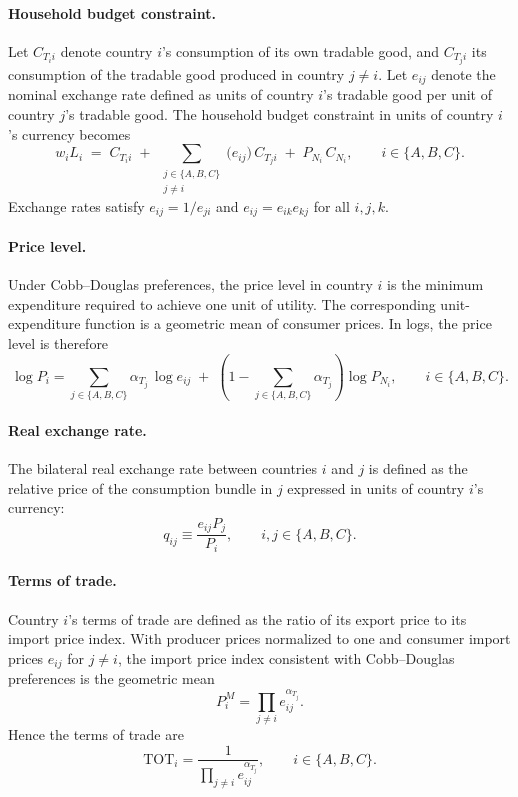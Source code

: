 \documentclass[11pt]{article}
\begin{document}
\paragraph{Household budget constraint.}
Let $C_{T_i i}$ denote country $i$’s consumption of its own tradable good, 
and $C_{T_j i}$ its consumption of the tradable good produced in country $j \neq i$. 
Let $e_{ij}$ denote the nominal exchange rate defined as units of country $i$’s tradable good per unit of country $j$’s tradable good. 
The household budget constraint in units of country $i$’s currency becomes
\begin{equation}
w_i L_i
\;=\;
C_{T_i i}
\;+\;
\sum_{\substack{j \in \{A,B,C\}\\ j \neq i}}
\big( e_{ij} \big)\, C_{T_j i}
\;+\;
P_{N_i}\, C_{N_i},
\qquad i \in \{A,B,C\}.
\end{equation}
Exchange rates satisfy $e_{ij}=1/e_{ji}$ and $e_{ij}=e_{ik}e_{kj}$ for all $i,j,k$.

\paragraph{Price level.}
Under Cobb--Douglas preferences, the price level in country $i$ is the minimum
expenditure required to achieve one unit of utility. The corresponding
unit-expenditure function is a geometric mean of consumer prices. In logs,
the price level is therefore
\begin{equation}
\log P_i
=
\sum_{j \in \{A,B,C\}} 
\alpha_{T_j}\, \log e_{ij}
\;+\;
\left(1 - \sum_{j \in \{A,B,C\}} \alpha_{T_j}\right)
\log P_{N_i},
\qquad i \in \{A,B,C\}.
\label{eq:price_level}
\end{equation}

\paragraph{Real exchange rate.} The bilateral real exchange rate between countries $i$ and $j$ is defined as the relative price of the consumption bundle in $j$ expressed in units of country $i$’s currency:
\begin{equation}
q_{ij} \equiv \frac{e_{ij} P_j}{P_i}, \qquad i,j \in \{A,B,C\}.
\label{eq:rer_bilateral}
\end{equation}

\paragraph{Terms of trade.} Country $i$'s terms of trade are defined as the ratio of its export price to its import price index. With producer prices normalized to one and consumer import prices $e_{ij}$ for $j\neq i$, the import price index consistent with Cobb--Douglas preferences is the geometric mean
\[
P^M_i = \prod_{j\neq i} e_{ij}^{\alpha_{T_j}}.
\]
Hence the terms of trade are
\begin{equation}
\mathrm{TOT}_i 
= \frac{1}{\prod_{j\neq i} e_{ij}^{\alpha_{T_j}}}, 
\qquad i\in\{A,B,C\}.
\label{eq:tot_notariffs}
\end{equation}
\end{document}
